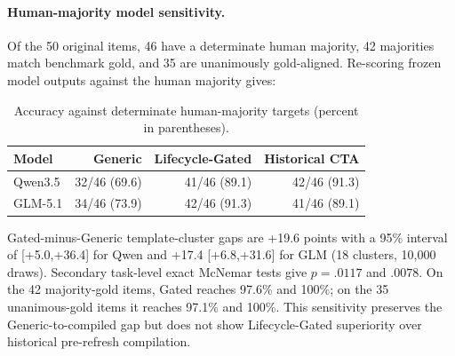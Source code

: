 \documentclass[10pt]{article}
\begin{document}
\paragraph{Human-majority model sensitivity.}
Of the 50 original items, 46 have a determinate human majority, 42 majorities match benchmark
gold, and 35 are unanimously gold-aligned. Re-scoring frozen model outputs against the human
majority gives:
\begin{table}[h]
\centering
\small
\begin{tabular}{lrrr}
\toprule
Model & Generic & Lifecycle-Gated & Historical CTA\\
\midrule
Qwen3.5 & 32/46 (69.6) & 41/46 (89.1) & 42/46 (91.3)\\
GLM-5.1 & 34/46 (73.9) & 42/46 (91.3) & 41/46 (89.1)\\
\bottomrule
\end{tabular}
\caption{Accuracy against determinate human-majority targets (percent in parentheses).}
\end{table}
Gated-minus-Generic template-cluster gaps are +19.6 points with a 95\% interval of
[+5.0,+36.4] for Qwen and +17.4 [+6.8,+31.6] for GLM (18 clusters, 10,000 draws).
Secondary task-level exact McNemar tests give $p=.0117$ and $.0078$.
On the 42 majority-gold items, Gated reaches 97.6\% and 100\%; on the 35 unanimous-gold
items it reaches 97.1\% and 100\%. This sensitivity preserves the Generic-to-compiled gap but
does not show Lifecycle-Gated superiority over historical pre-refresh compilation.
\end{document}
